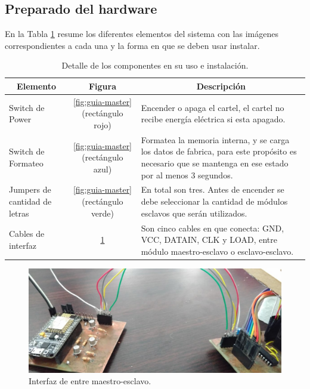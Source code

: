 \subsection{Preparado del hardware}

En la Tabla \ref{table:uso-instalacion} resume los diferentes elementos del sistema con las imágenes correspondientes a cada una y la forma en que se deben usar instalar.

\begin{table}[ht!]
	\centering
	\caption{Detalle de los componentes en su uso e instalación.}
	\label{table:uso-instalacion}
	\begin{tabular}{lcp{}}
		\multicolumn{1}{c}{Elemento}	& Figura & \multicolumn{1}{c}{Descripción} \\ \hline
		Switch de Power         		& \ref{fig:guia-master} (rectángulo rojo)	& Encender o apaga el cartel, el cartel no recibe energía eléctrica si esta apagado. \\ \hline
		Switch de Formateo      		& \ref{fig:guia-master} (rectángulo azul)	& Formatea la memoria interna, y se carga los datos de fabrica, para este propósito es necesario que se mantenga en ese estado por al menos 3 segundos. \\ \hline
		Jumpers de cantidad de letras	& \ref{fig:guia-master} (rectángulo verde)	& En total son tres. Antes de encender se debe seleccionar la cantidad de módulos esclavos que serán utilizados. \\ \hline
		Cables de interfaz 				& \ref{fig:interfaz-master-slave}			& Son cinco cables en que conecta: GND, VCC, DATAIN, CLK y LOAD, entre módulo maestro-esclavo o esclavo-esclavo.
	\end{tabular}
\end{table}

\begin{figure}[!ht]
	\centering
	\includegraphics[width=\linewidth]{imagenes/guia/interfaz.jpeg}
	\caption{Interfaz de entre maestro-esclavo.}
	\label{fig:interfaz-master-slave}
\end{figure}


